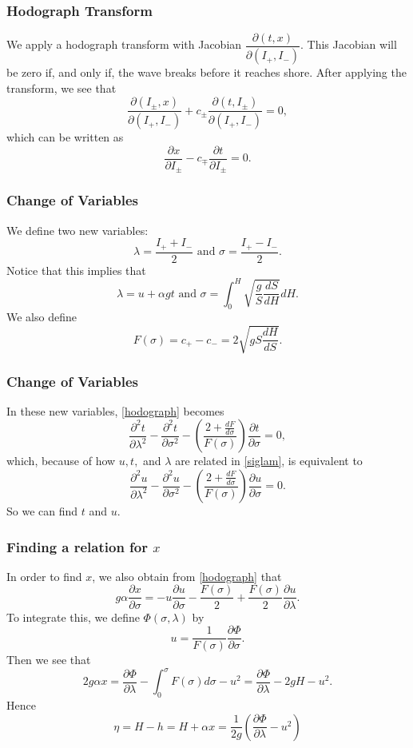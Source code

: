 \begin{frame}
\frametitle{Hodograph Transform}
We apply a hodograph transform with Jacobian $\dfrac{\partial (t,x)}{\partial(I_+, I_-)}$. This Jacobian will be zero if, and only if, the wave breaks before it reaches shore. After applying the transform, we see that
\[
\frac{\partial(I_\pm,x)}{\partial(I_+,I_-)} + c_\pm \frac{\partial (t, I_\pm)}{\partial(I_+,I_-)} = 0,
\]
which can be written as
\begin{equation}\label{hodograph}
\frac{\partial x}{\partial I_\pm} - c_\mp \frac{\partial t}{\partial I_\pm} = 0.
\end{equation}
\end{frame}

\begin{frame}
\frametitle{Change of Variables}
We define two new variables:
\[
\lambda = \frac{I_+ + I_-}{2} \text{ and } \sigma = \frac{I_+ - I_-}{2}.
\]
Notice that this implies that
\begin{equation} \label{siglam}
\lambda = u + \alpha g t \text{ and } \sigma = \int_0^H \sqrt{\frac{g}{S} \frac{dS}{dH}}dH.
\end{equation}
We also define
\[
F(\sigma) = c_+ - c_- = 2 \sqrt{gS \frac{dH}{dS}}.
\]
\end{frame}

\begin{frame}
\frametitle{Change of Variables}
In these new variables, \eqref{hodograph} becomes
\[
\frac{\partial^2 t}{\partial \lambda^2} - \frac{\partial^2 t}{\partial \sigma^2} - \left( \frac{2 + \frac{dF}{d\sigma}}{F(\sigma)} \right) \frac{\partial t}{\partial \sigma} = 0,
\]
which, because of how $u,t,$ and $\lambda$ are related in \eqref{siglam}, is equivalent to
\begin{equation}\label{finalu}
\frac{\partial^2 u}{\partial \lambda^2} - \frac{\partial^2 u}{\partial \sigma^2} - \left( \frac{2 + \frac{dF}{d\sigma}}{F(\sigma)} \right) \frac{\partial u}{\partial \sigma} = 0.
\end{equation}
So we can find $t$ and $u$.
\end{frame}

\begin{frame}
\frametitle{Finding a relation for $x$}
In order to find $x$, we also obtain from \eqref{hodograph} that
\[
g \alpha \frac{\partial x}{\partial \sigma} = - u \frac{\partial u}{\partial \sigma} - \frac{F(\sigma)}{2} + \frac{F(\sigma)}{2} \frac{\partial u}{\partial \lambda}.
\]
To integrate this, we define $\Phi(\sigma,\lambda)$ by
\[
u = \frac{1}{F(\sigma)} \frac{\partial \Phi}{\partial \sigma}.
\]
Then we see that
\[
2 g \alpha x = \frac{\partial \Phi}{\partial \lambda} - \int_0^\sigma F(\sigma) d\sigma - u^2 = \frac{\partial \Phi}{\partial \lambda} - 2gH - u^2.
\]
Hence
\[
\eta = H - h = H + \alpha x = \frac{1}{2g} \left(\frac{\partial \Phi}{\partial \lambda} - u^2 \right)
\]
\end{frame}

